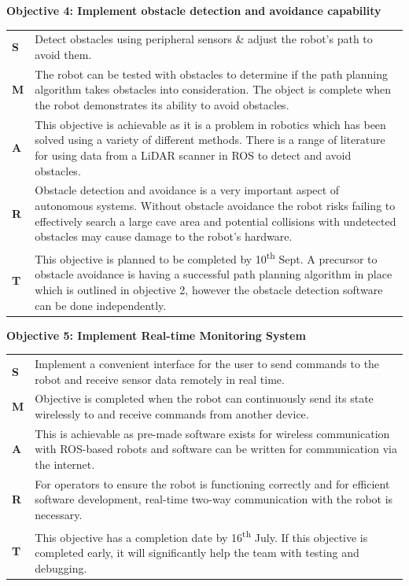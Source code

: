 \textbf{Objective 4: Implement obstacle detection and avoidance capability}

\begin{tabularx}{\textwidth}{M{1cm}|R{14cm}}
    \textbf{S} & Detect obstacles using peripheral sensors \& adjust the robot’s path to avoid them. \\
    \textbf{M} & The robot can be tested with obstacles to determine if the path planning algorithm takes obstacles into consideration. The object is complete when the robot demonstrates its ability to avoid obstacles. \\
    \textbf{A} & This objective is achievable as it is a problem in robotics which has been solved using a variety of different methods. There is a range of literature for using data from a LiDAR scanner in ROS to detect and avoid obstacles. \\
    \textbf{R} & Obstacle detection and avoidance is a very important aspect of autonomous systems. Without obstacle avoidance the robot risks failing to effectively search a large cave area and potential collisions with undetected obstacles may cause damage to the robot’s hardware.\\
    \textbf{T} & This objective is planned to be completed by 10\textsuperscript{th} Sept. A precursor to obstacle avoidance is having a successful path planning algorithm in place which is outlined in objective 2, however the obstacle detection software can be done independently.\\   
\end{tabularx}

\textbf{Objective 5: Implement Real-time Monitoring System}

\begin{tabularx}{\textwidth}{M{1cm}|R{14cm}}
    \textbf{S} & Implement a convenient interface for the user to send commands to the robot and receive sensor data remotely in real time. \\
    \textbf{M} & Objective is completed when the robot can continuously send its state wirelessly to and receive commands from another device. \\
    \textbf{A} & This is achievable as pre-made software exists for wireless communication with ROS-based robots and software can be written for communication via the internet. \\
    \textbf{R} & For operators to ensure the robot is functioning correctly and for efficient software development, real-time two-way communication with the robot is necessary. \\
    \textbf{T} & This objective has a completion date by 16\textsuperscript{th} July. If this objective is completed early, it will significantly help the team with testing and debugging. \\
\end{tabularx}
\egroup

